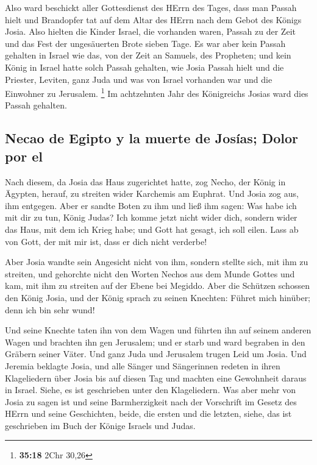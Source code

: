  Also ward beschickt aller Gottesdienst des HErrn des
Tages, dass man Passah hielt und Brandopfer tat auf dem Altar des HErrn
nach dem Gebot des Königs Josia.  Also hielten die Kinder
Israel, die vorhanden waren, Passah zu der Zeit und das Fest der
ungesäuerten Brote sieben Tage.  Es war aber kein Passah
gehalten in Israel wie das, von der Zeit an Samuels, des Propheten; und
kein König in Israel hatte solch Passah gehalten, wie Josia Passah hielt
und die Priester, Leviten, ganz Juda und was von Israel vorhanden war
und die Einwohner zu Jerusalem. \footnote{\textbf{35:18} 2Chr 30,26}
 Im achtzehnten Jahr des Königreichs Josias ward dies
Passah gehalten.

\hypertarget{necao-de-egipto-y-la-muerte-de-josuxedas-dolor-por-el}{%
\subsection{Necao de Egipto y la muerte de Josías; Dolor por
el}\label{necao-de-egipto-y-la-muerte-de-josuxedas-dolor-por-el}}

 Nach diesem, da Josia das Haus zugerichtet hatte, zog
Necho, der König in Ägypten, herauf, zu streiten wider Karchemis am
Euphrat. Und Josia zog aus, ihm entgegen.  Aber er sandte
Boten zu ihm und ließ ihm sagen: Was habe ich mit dir zu tun, König
Judas? Ich komme jetzt nicht wider dich, sondern wider das Haus, mit dem
ich Krieg habe; und Gott hat gesagt, ich soll eilen. Lass ab von Gott,
der mit mir ist, dass er dich nicht verderbe!

 Aber Josia wandte sein Angesicht nicht von ihm, sondern
stellte sich, mit ihm zu streiten, und gehorchte nicht den Worten Nechos
aus dem Munde Gottes und kam, mit ihm zu streiten auf der Ebene bei
Megiddo.  Aber die Schützen schossen den König Josia, und
der König sprach zu seinen Knechten: Führet mich hinüber; denn ich bin
sehr wund!

 Und seine Knechte taten ihn von dem Wagen und führten
ihn auf seinem anderen Wagen und brachten ihn gen Jerusalem; und er
starb und ward begraben in den Gräbern seiner Väter. Und ganz Juda und
Jerusalem trugen Leid um Josia.  Und Jeremia beklagte
Josia, und alle Sänger und Sängerinnen redeten in ihren Klageliedern
über Josia bis auf diesen Tag und machten eine Gewohnheit daraus in
Israel. Siehe, es ist geschrieben unter den Klageliedern.
 Was aber mehr von Josia zu sagen ist und seine
Barmherzigkeit nach der Vorschrift im Gesetz des HErrn 
und seine Geschichten, beide, die ersten und die letzten, siehe, das ist
geschrieben im Buch der Könige Israels und Judas.

